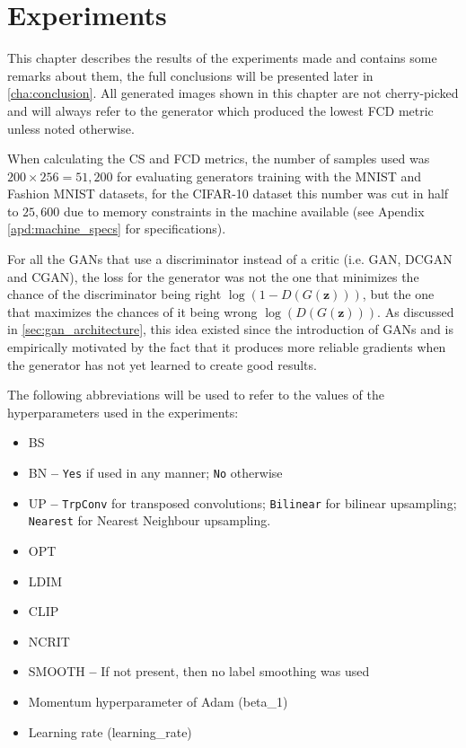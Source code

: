 
\chapter{Experiments} \label{cha:experiments}
This chapter describes the results of the experiments made and contains some remarks about them, the full conclusions will be presented later in \autoref{cha:conclusion}. All generated images shown in this chapter are not cherry-picked and will always refer to the generator which produced the lowest \gls{FCD} metric unless noted otherwise.

When calculating the \gls{CS} and \gls{FCD} metrics, the number of samples used was $200\times256 = 51,200$ for evaluating generators training with the \gls{MNIST} and Fashion MNIST datasets, for the \gls{CIFAR}-10 dataset this number was cut in half to $25,600$ due to memory constraints in the machine available (see Apendix \ref{apd:machine_specs} for specifications).

For all the \acp{GAN} that use a discriminator instead of a critic (i.e. \gls{GAN}, \gls{DCGAN} and \gls{CGAN}), the loss for the generator was not the one that minimizes the chance of the discriminator being right $\log(1 - D(G(\bm{z})))$, but the one that maximizes the chances of it being wrong $\log(D(G(\bm{z})))$. As discussed in \autoref{sec:gan_architecture}, this idea existed since the introduction of \acp{GAN} \cite{gans2014} and is empirically motivated by the fact that it produces more reliable gradients when the generator has not yet learned to create good results.

The following abbreviations will be used to refer to the values of the hyperparameters used in the experiments: 
\begin{itemize}
    \item \gls{BS}
    \item {}\gls{BN} \textbf{--} \texttt{Yes} if used in any manner; \texttt{No} otherwise
    \item \gls{UP} \textbf{--} \texttt{TrpConv} for transposed convolutions; \texttt{Bilinear} for bilinear upsampling; \texttt{Nearest} for Nearest Neighbour upsampling.
    \item \gls{OPT}
    \item \gls{LDIM}
    \item \gls{CLIP}
    \item \gls{NCRIT}
    \item \gls{SMOOTH} \textbf{--} If not present, then no label smoothing was used
    \item Momentum hyperparameter of Adam (\gls{beta_1})
    \item Learning rate (\gls{learning_rate})
\end{itemize}








